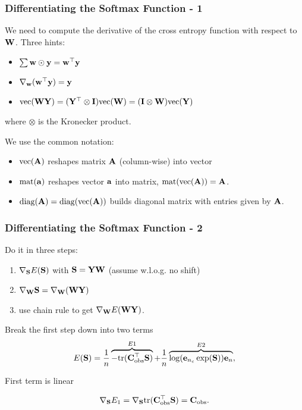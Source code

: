 \documentclass[12pt,fleqn,handout]{beamer}
\begin{document}
 \begin{frame}\frametitle{Differentiating the Softmax Function - 1}

We need to compute the derivative of the cross entropy function with respect to ${\bf W}$.
Three hints:
\begin{itemize}
\item $\sum {\bf w} \odot {\bf y} = {\bf w}^{\top} {\bf y} $
\item $\nabla_{{\bf w}} ({\bf w}^{\top} {\bf y}) = {\bf y}$
\item ${\rm vec} ({\bf W} {\bf Y}) = ({\bf Y}^\top \otimes {\bf I}) {\rm vec} ({\bf W}) = ({\bf I} \otimes {\bf W}) {\rm vec}({\bf Y})$
\end{itemize}
where $\otimes$ is the Kronecker product.

\bigskip



We use the common notation:
\begin{itemize}
	\item ${\rm vec}({\bf A})$ reshapes matrix ${\bf A}$ (column-wise) into vector
	\item ${\rm mat}({\bf a})$ reshapes vector ${\bf a}$ into matrix, ${\rm mat}({\rm vec}({\bf A})) = {\bf A}$.
	\item ${\rm diag}({\bf A}) = {\rm diag}({\rm vec}( {\bf A}))$ builds diagonal matrix with entries given by ${\bf A}$. 
\end{itemize}


\end{frame}

\begin{frame}[fragile]\frametitle{Differentiating the Softmax Function - 2}

Do it in three steps:
\begin{enumerate}
	\item $\nabla_{{\bf S}} E({\bf S})$ with ${\bf S} = {\bf Y} {\bf W}$ (assume w.l.o.g. no shift)
	\item $\nabla_{{\bf W}} {\bf S} = \nabla_{{\bf W}} ({\bf W} {\bf Y})$
	\item use chain rule to get $\nabla_{{\bf W}} E({\bf W}{\bf Y})$.
\end{enumerate}

\bigskip
\pause

Break the first step down into two terms
$$ E({\bf S}) = \frac{1}{n} \overbrace{-{\rm tr}({\bf C}_{\rm obs}^{\top} {\bf S})}^{E1} + \frac{1}{n} \overbrace{\log({\bf e}_{n_c}\exp({\bf S})){\bf e}_n}^{E2}, $$


\bigskip
\pause

First term is linear

$$\nabla_{{\bf S}}E_1 =  \nabla_{{\bf S}} {\rm tr}({\bf C}_{\rm obs}^{\top} {\bf S}) = {\bf C}_{\rm obs}. $$

\end{frame}
\end{document}
